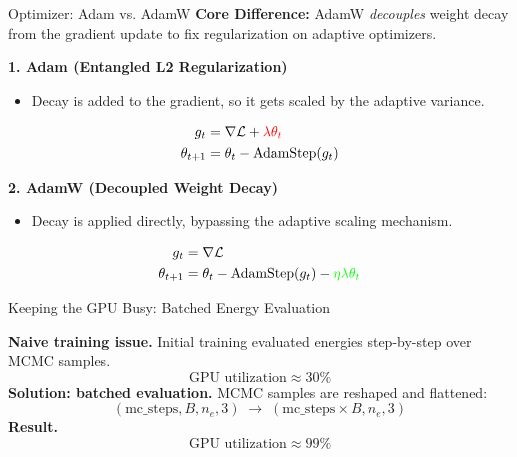 \documentclass{beamer}
\begin{document}
\begin{frame}{Optimizer: Adam vs. AdamW}
    \textbf{Core Difference:} AdamW \textit{decouples} weight decay from the gradient update to fix regularization on adaptive optimizers.

    \vspace{1.5em}

    \textbf{1. Adam (Entangled L2 Regularization)}
    \begin{itemize}
        \item Decay is added to the gradient, so it gets scaled by the adaptive variance.
    \end{itemize}
    \begin{align*}
        g_t &= \nabla \mathcal{L} + \color{red}\lambda \theta_t \\
        \theta_{t+1} &= \theta_t - \text{AdamStep}(g_t)
    \end{align*}

    \vspace{1em}

    \textbf{2. AdamW (Decoupled Weight Decay)}
    \begin{itemize}
        \item Decay is applied directly, bypassing the adaptive scaling mechanism.
    \end{itemize}
    \begin{align*}
        g_t &= \nabla \mathcal{L} \\
        \theta_{t+1} &= \theta_t - \text{AdamStep}(g_t) - \color{green}\eta \lambda \theta_t
    \end{align*}

    \vfill
\end{frame}


\begin{frame}{Keeping the GPU Busy: Batched Energy Evaluation}

\small
\textbf{Naive training issue.}
Initial training evaluated energies step-by-step over MCMC samples.
\[
\text{GPU utilization} \approx 30\%
\]
\textbf{Solution: batched evaluation.}
MCMC samples are reshaped and flattened:
\[
(\text{mc\_steps}, B, n_e, 3)
\;\rightarrow\;
(\text{mc\_steps}\!\times\! B, n_e, 3)
\]
\vspace{0.3cm}
\textbf{Result.}
\[
\text{GPU utilization} \approx 99\%
\]
\end{frame}
\end{document}
